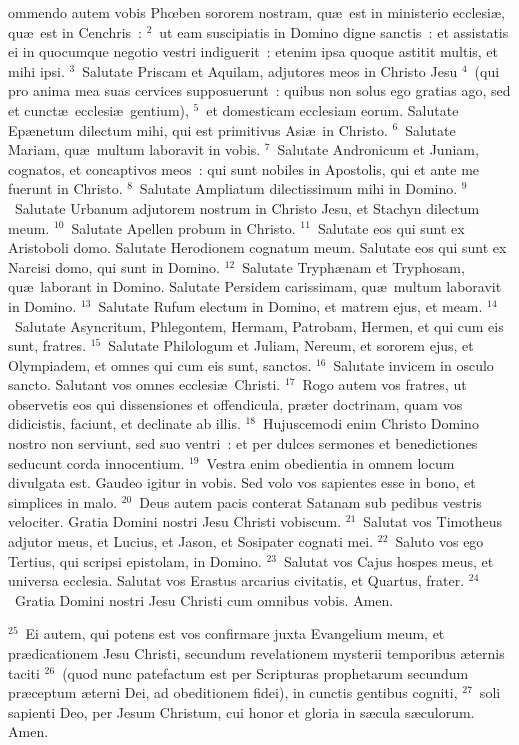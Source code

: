\bchapter
{}ommendo autem vobis Phœben sororem nostram, qu\ae\ est in ministerio ecclesi\ae , qu\ae\ est in Cenchris~:
${}^{2}$~ut eam suscipiatis in Domino digne sanctis~: et assistatis ei in quocumque negotio vestri indiguerit~: etenim ipsa quoque astitit multis, et mihi ipsi.
${}^{3}$~Salutate Priscam et Aquilam, adjutores meos in Christo Jesu
${}^{4}$~(qui pro anima mea suas cervices supposuerunt~: quibus non solus ego gratias ago, sed et cunct\ae\ ecclesi\ae\ gentium),
${}^{5}$~et domesticam ecclesiam eorum. Salutate Ep\ae netum dilectum mihi, qui est primitivus Asi\ae\ in Christo.
${}^{6}$~Salutate Mariam, qu\ae\ multum laboravit in vobis.
${}^{7}$~Salutate Andronicum et Juniam, cognatos, et concaptivos meos~: qui sunt nobiles in Apostolis, qui et ante me fuerunt in Christo.
${}^{8}$~Salutate Ampliatum dilectissimum mihi in Domino.
${}^{9}$~Salutate Urbanum adjutorem nostrum in Christo Jesu, et Stachyn dilectum meum.
${}^{10}$~Salutate Apellen probum in Christo.
${}^{11}$~Salutate eos qui sunt ex Aristoboli domo. Salutate Herodionem cognatum meum. Salutate eos qui sunt ex Narcisi domo, qui sunt in Domino.
${}^{12}$~Salutate Tryph\ae nam et Tryphosam, qu\ae\ laborant in Domino. Salutate Persidem carissimam, qu\ae\ multum laboravit in Domino.
${}^{13}$~Salutate Rufum electum in Domino, et matrem ejus, et meam.
${}^{14}$~Salutate Asyncritum, Phlegontem, Hermam, Patrobam, Hermen, et qui cum eis sunt, fratres.
${}^{15}$~Salutate Philologum et Juliam, Nereum, et sororem ejus, et Olympiadem, et omnes qui cum eis sunt, sanctos.
${}^{16}$~Salutate invicem in osculo sancto. Salutant vos omnes ecclesi\ae\ Christi.
${}^{17}$~Rogo autem vos fratres, ut observetis eos qui dissensiones et offendicula, pr\ae ter doctrinam, quam vos didicistis, faciunt, et declinate ab illis.
${}^{18}$~Hujuscemodi enim Christo Domino nostro non serviunt, sed suo ventri~: et per dulces sermones et benedictiones seducunt corda innocentium.
${}^{19}$~Vestra enim obedientia in omnem locum divulgata est. Gaudeo igitur in vobis. Sed volo vos sapientes esse in bono, et simplices in malo.
${}^{20}$~Deus autem pacis conterat Satanam sub pedibus vestris velociter. Gratia Domini nostri Jesu Christi vobiscum.
${}^{21}$~Salutat vos Timotheus adjutor meus, et Lucius, et Jason, et Sosipater cognati mei.
${}^{22}$~Saluto vos ego Tertius, qui scripsi epistolam, in Domino.
${}^{23}$~Salutat vos Cajus hospes meus, et universa ecclesia. Salutat vos Erastus arcarius civitatis, et Quartus, frater.
${}^{24}$~Gratia Domini nostri Jesu Christi cum omnibus vobis. Amen.


${}^{25}$~Ei autem, qui potens est vos confirmare juxta Evangelium meum, et pr\ae dicationem Jesu Christi, secundum revelationem mysterii temporibus \ae ternis taciti
${}^{26}$~(quod nunc patefactum est per Scripturas prophetarum secundum pr\ae ceptum \ae terni Dei, ad obeditionem fidei), in cunctis gentibus cogniti,
${}^{27}$~soli sapienti Deo, per Jesum Christum, cui honor et gloria in s\ae cula s\ae culorum. Amen.
